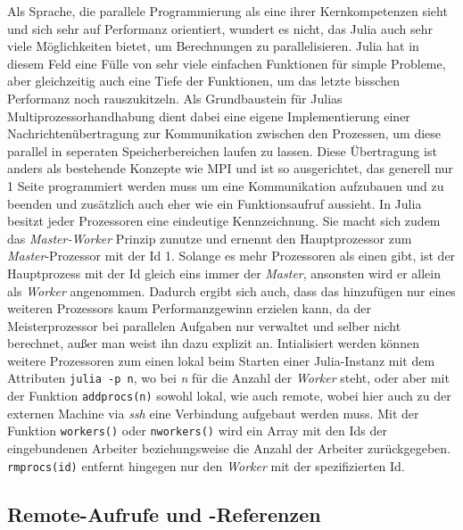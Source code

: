 \documentclass[proseminar,german,utf8]{zihpub}
\begin{document}
Als Sprache, die parallele Programmierung als eine ihrer Kernkompetenzen sieht und sich sehr auf Performanz orientiert, wundert es nicht, das Julia auch sehr viele Möglichkeiten bietet, um Berechnungen zu parallelisieren. Julia hat in diesem Feld eine Fülle von sehr viele einfachen Funktionen für simple Probleme, aber gleichzeitig auch eine Tiefe der Funktionen, um das letzte bisschen Performanz noch rauszukitzeln. Als Grundbaustein für Julias Multiprozessorhandhabung dient dabei eine eigene Implementierung einer Nachrichtenübertragung zur Kommunikation zwischen den Prozessen, um diese parallel in seperaten Speicherbereichen laufen zu lassen. Diese Übertragung ist anders als bestehende Konzepte wie MPI und ist so ausgerichtet, das generell nur 1 Seite programmiert werden muss um eine Kommunikation aufzubauen und zu beenden und zusätzlich auch eher wie ein Funktionsaufruf aussieht. In Julia besitzt jeder Prozessoren eine eindeutige Kennzeichnung. Sie macht sich zudem das \textit{Master-Worker} Prinzip zunutze und ernennt den Hauptprozessor zum \textit{Master}-Prozessor mit der Id 1. Solange es mehr Prozessoren als einen gibt, ist der Hauptprozess mit der Id gleich eins immer der \textit{Master}, ansonsten wird er allein als \textit{Worker} angenommen. Dadurch ergibt sich auch, dass das hinzufügen nur eines weiteren Prozessors kaum Performanzgewinn erzielen kann, da der Meisterprozessor bei parallelen Aufgaben nur verwaltet und selber nicht berechnet, außer man weist ihn dazu explizit an. Intialisiert werden können weitere Prozessoren zum einen lokal beim Starten einer Julia-Instanz mit dem Attributen \verb|julia -p n|, wo bei \textit{n} für die Anzahl der \textit{Worker} steht, oder aber mit der Funktion \verb|addprocs(n)| sowohl lokal, wie auch remote, wobei hier auch zu der externen Machine via \textit{ssh} eine Verbindung aufgebaut werden muss. Mit der Funktion \verb|workers()| oder \verb|nworkers()| wird ein Array mit den Ids der eingebundenen Arbeiter beziehungsweise die Anzahl der Arbeiter zurückgegeben. \verb|rmprocs(id)| entfernt hingegen nur den \textit{Worker} mit der spezifizierten Id.

\subsection{Remote-Aufrufe und -Referenzen}
\end{document}
